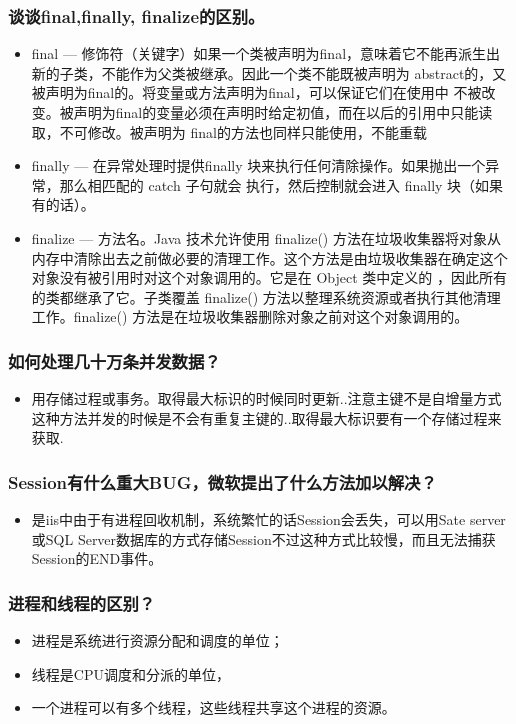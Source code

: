\documentclass[9pt, b5paper]{article}
\begin{document}
\subsubsection{谈谈final,finally, finalize的区别。}
\label{sec-1-1-50}
\begin{itemize}
\item final — 修饰符（关键字）如果一个类被声明为final，意味着它不能再派生出新的子类，不能作为父类被继承。因此一个类不能既被声明为 abstract的，又被声明为final的。将变量或方法声明为final，可以保证它们在使用中 不被改变。被声明为final的变量必须在声明时给定初值，而在以后的引用中只能读取，不可修改。被声明为 final的方法也同样只能使用，不能重载
\item finally — 在异常处理时提供finally 块来执行任何清除操作。如果抛出一个异常，那么相匹配的 catch 子句就会 执行，然后控制就会进入 finally 块（如果有的话）。
\item finalize — 方法名。Java 技术允许使用 finalize() 方法在垃圾收集器将对象从内存中清除出去之前做必要的清理工作。这个方法是由垃圾收集器在确定这个对象没有被引用时对这个对象调用的。它是在 Object 类中定义的 ，因此所有的类都继承了它。子类覆盖 finalize() 方法以整理系统资源或者执行其他清理工作。finalize() 方法是在垃圾收集器删除对象之前对这个对象调用的。
\end{itemize}
\subsubsection{如何处理几十万条并发数据？}
\label{sec-1-1-51}
\begin{itemize}
\item 用存储过程或事务。取得最大标识的时候同时更新..注意主键不是自增量方式这种方法并发的时候是不会有重复主键的..取得最大标识要有一个存储过程来获取.
\end{itemize}
\subsubsection{Session有什么重大BUG，微软提出了什么方法加以解决？}
\label{sec-1-1-52}
\begin{itemize}
\item 是iis中由于有进程回收机制，系统繁忙的话Session会丢失，可以用Sate server或SQL Server数据库的方式存储Session不过这种方式比较慢，而且无法捕获Session的END事件。
\end{itemize}
\subsubsection{进程和线程的区别？}
\label{sec-1-1-53}
\begin{itemize}
\item 进程是系统进行资源分配和调度的单位；
\item 线程是CPU调度和分派的单位，
\item 一个进程可以有多个线程，这些线程共享这个进程的资源。
\end{itemize}
\end{document}
